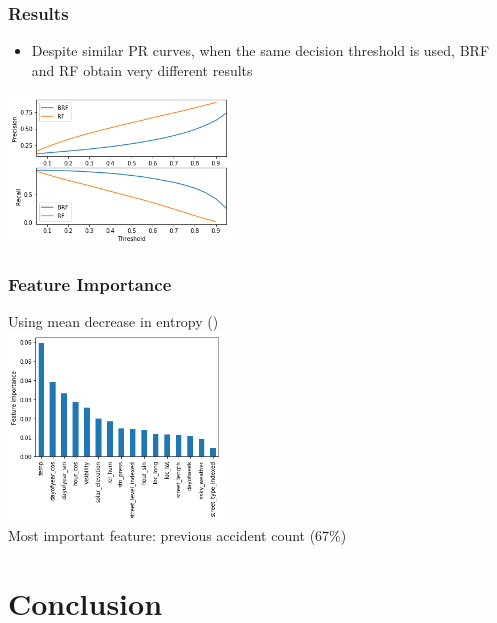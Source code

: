 \documentclass[slidestop,compress,red,mathserif]{beamer}
\begin{document}
\begin{frame}
	\frametitle{Results}
	\begin{itemize}
		\item Despite similar PR curves, when the same decision threshold is used, BRF and RF obtain very different results 
	\end{itemize}
\centering
\includegraphics[height=4cm, keepaspectratio]{Figures/pr_threshold.png}
\end{frame}

\begin{frame}
	\frametitle{Feature Importance}
\centering
\hspace*{-2cm} Using mean decrease in entropy (\cite{louppe2013understanding}) \\
\includegraphics[height=5cm, keepaspectratio]{Figures/features.png} \\
\hspace*{-2cm} Most important feature: previous accident count (67\%)

\end{frame}

\section{Conclusion}
\end{document}
